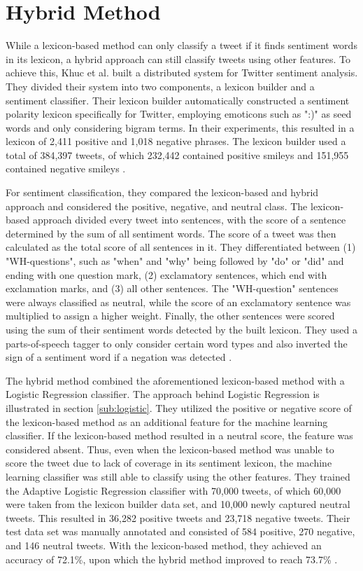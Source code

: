 \section{Hybrid Method}
While a lexicon-based method can only classify a tweet if it finds sentiment words in its lexicon, a hybrid approach can still classify tweets using other features. To achieve this, Khuc et al. built a distributed system for Twitter sentiment analysis. They divided their system into two components, a lexicon builder and a sentiment classifier. Their lexicon builder automatically constructed a sentiment polarity lexicon specifically for Twitter, employing emoticons such as ":)" as seed words and only considering bigram terms. In their experiments, this resulted in a lexicon of 2,411 positive and 1,018 negative phrases. The lexicon builder used a total of 384,397 tweets, of which 232,442 contained positive smileys and 151,955 contained negative smileys \cite{khuc}.

For sentiment classification, they compared the lexicon-based and hybrid approach and considered the positive, negative, and neutral class. The lexicon-based approach divided every tweet into sentences, with the score of a sentence determined by the sum of all sentiment words. The score of a tweet was then calculated as the total score of all sentences in it. They differentiated between (1) "WH-questions", such as "when" and "why" being followed by "do" or "did" and ending with one question mark, (2) exclamatory sentences, which end with exclamation marks, and (3) all other sentences. The "WH-question" sentences were always classified as neutral, while the score of an exclamatory sentence was multiplied to assign a higher weight. Finally, the other sentences were scored using the sum of their sentiment words detected by the built lexicon. They used a parts-of-speech tagger to only consider certain word types and also inverted the sign of a sentiment word if a negation was detected \cite{khuc}.

The hybrid method combined the aforementioned lexicon-based method with a Logistic Regression classifier. The approach behind Logistic Regression is illustrated in section \ref{sub:logistic}. They utilized the positive or negative score of the lexicon-based method as an additional feature for the machine learning classifier. If the lexicon-based method resulted in a neutral score, the feature was considered absent. Thus, even when the lexicon-based method was unable to score the tweet due to lack of coverage in its sentiment lexicon, the machine learning classifier was still able to classify using the other features. They trained the Adaptive Logistic Regression classifier with 70,000 tweets, of which 60,000 were taken from the lexicon builder data set, and 10,000 newly captured neutral tweets. This resulted in 36,282 positive tweets and 23,718 negative tweets. Their test data set was manually annotated and consisted of 584 positive, 270 negative, and 146 neutral tweets. With the lexicon-based method, they achieved an accuracy of 72.1\%, upon which the hybrid method improved to reach 73.7\% \cite{khuc}.










